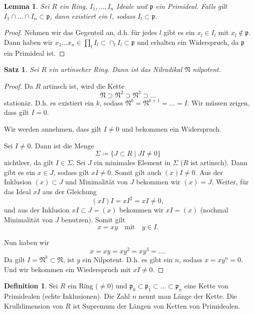 \documentclass[reqno,12pt]{article}
\numberwithin{equation}{section}
\theoremstyle{plain}
\newtheorem{lemma}[thm]{Lemma}
\newtheorem{proposition}[thm]{Satz}
\theoremstyle{definition}
\newtheorem{definition}[thm]{Definition}
\begin{document}
\begin{lemma}\label{lemma-intersection-lies-in-prime-ideal}
Sei $R$ ein Ring, $I_1, \dots, I_n$ Ideale und $\mathfrak{p}$ ein Primideal. Falls gilt $I_1 \cap \dots \cap I_n \subset \mathfrak{p}$, dann existiert ein $l$, sodass $I_l \subset \mathfrak{p}$.
\end{lemma}

\begin{proof}
Nehmen wir das Gegenteil an, d.h. für jedes $l$ gibt es ein $x_l \in I_l$ mit $x_l \notin \mathfrak{p}$. Dann haben wir $x_1 \dots x_n \in \prod_l I_l \subset \cap_l I_l \subset \mathfrak{p}$ und erhalten ein Widerspruch, da $\mathfrak{p}$ ein Primideal ist.
\end{proof}



\begin{proposition}\label{proposition-artinian-radical-nilpotent}
Sei $R$ ein artinscher Ring. Dann ist das Nilradikal $\mathfrak{N}$ nilpotent.
\end{proposition}

\begin{proof}
Da $R$ artinsch ist, wird die Kette
$$
\mathfrak{N}  \supset \mathfrak{N}^2 \supset \mathfrak{N}^3 \supset \dots
$$
stationär. D.h. es existiert ein $k$, sodass $\mathfrak{N}^k = \mathfrak{N}^{k+1} = \dots = I$. Wir müssen zeigen, dass gilt $I=0$.

Wir werden annehmen, dass gilt $I \neq 0$ und bekommen ein Widerspruch.

Sei $I \neq 0$. Dann ist die Menge
$$
\Sigma \coloneqq \{ J \subset R \mid JI \neq 0 \}
$$
nichtleer, da gilt $I \in \Sigma$. Sei $J$ ein minimales Element in $\Sigma$ ($R$ ist artinsch). Dann gibt es ein $x \in J$, sodass gilt $xI \neq 0$. Somit gilt auch $(x)I \neq 0$. Aus der Inklusion $(x) \subset J$ und Minimalität von $J$ bekommen wir $(x) = J$. Weiter, für das Ideal $xI$ aus der Gleichung
$$
(xI)I = x I^2 = xI \neq 0,
$$
und aus der Inklusion $xI \subset J=(x)$ bekommen wir $xI=(x)$ (nochmal Minimalität von $J$ benutzen). Somit gilt
$$
x = xy \quad \text{mit} \quad y \in I.
$$

Nun haben wir
$$
x = xy = xy^2 = xy^3 = \dots.
$$
Da gilt $I = \mathfrak{N}^k \subset \mathfrak{N}$, ist $y$ ein Nilpotent. D.h. es gibt ein $n$, sodass $x = xy^n = 0$. Und wir bekommen ein Wiederspruch mit $xI \neq 0$.
\end{proof}


\begin{definition}
Sei $R$ ein Ring ($\neq 0$) und $\mathfrak{p}_0 \subset \mathfrak{p}_1 \subset \dots \subset \mathfrak{p}_n$ eine Kette von Primidealen (echte Inklusionen). Die Zahl $n$ nennt man {\sf Länge} der Kette. Die {\sf Krulldimension} von $R$ ist Supremum der Längen von Ketten von Primidealen.
\end{definition}
\end{document}
